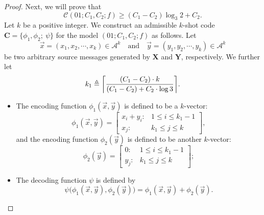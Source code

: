 \documentclass[11pt,draftclsnofoot,onecolumn]{IEEEtran}
\newcommand{\mbC}{\mathbf{C}}
\begin{document}
{\begin{proof}
 Next, we will prove that
\begin{equation}
 \mathcal{C}(01;C_1,C_2;f)\geq(C_1-C_2)\log_{3}2+C_2.\label{C_1-C2-Net_cap_low_bound}
\end{equation}
Let $k$ be  a positive integer.
 We construct an admissible $k$-shot code $\mbC=\big\{\phi_1,\phi_2;~\psi\big\}$ for the model $(01;C_1,C_2;f)$ as follows.
 Let
 \begin{equation*}
 \vec{x}=(x_1,x_2,\cdots,x_k)\in\mathcal{A}^k\quad \text{and}\quad \vec{y}=(y_1,y_2,\cdots,y_k)\in\mathcal{A}^k
 \end{equation*}
  be two arbitrary source messages generated by
 $\boldsymbol{X}$ and $\boldsymbol{Y}$, respectively. We further let
 \begin{equation}
 k_{1}\triangleq\bigg\lceil\frac{(C_1-C_2)\cdot k}{(C_1-C_2)+C_2\cdot\log3}\bigg\rceil.
 \label{eq:C1-C2-encod-hat{k}1-value}
 \end{equation}
 \begin{itemize}
 \item The  encoding function $\phi_{1}(\vec{x},\vec{y})$  is defined to be a $k$-vector:
\begin{equation}\label{eq:C1-C2-encod-fun-1}
 \phi_{1}(\vec{x},\vec{y})=
 \begin{bmatrix}
 x_{i}+y_{i}:&1\leq i\leq k_{1}-1\\
 x_{j}:&k_{1}\leq j\leq k
 \end{bmatrix},
\end{equation}
and the encoding function $\phi_2(\vec{y})$ is defined to be another $k$-vector:
\begin{equation}\label{eq:C1-C2-encod-fun-2}
  \phi_{2}(\vec{y})=\begin{bmatrix}
  0: &1\leq i\leq k_{1}-1\\
  y_{j}: &k_{1}\leq j\leq k
  \end{bmatrix};
\end{equation}
\item  The decoding function $\psi$ is defined by
\begin{equation*}
		\psi\big( \phi_{1}(\vec{x},\vec{y}),\phi_{2}(\vec{y})\big)
= \phi_{1}(\vec{x},\vec{y})+
\phi_{2}(\vec{y}).
\end{equation*}
\end{itemize}


\end{proof}}
\end{document}
